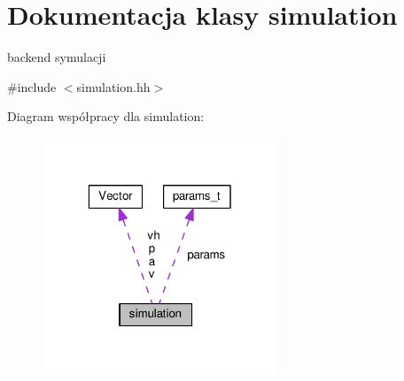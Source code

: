\hypertarget{classsimulation}{\section{Dokumentacja klasy simulation}
\label{classsimulation}
}


backend symulacji  




{\ttfamily \#include $<$simulation.\-hh$>$}



Diagram współpracy dla simulation\-:\nopagebreak
\begin{figure}[H]
\begin{center}
\leavevmode
\includegraphics[width=199pt]{classsimulation__coll__graph}
\end{center}
\end{figure}
